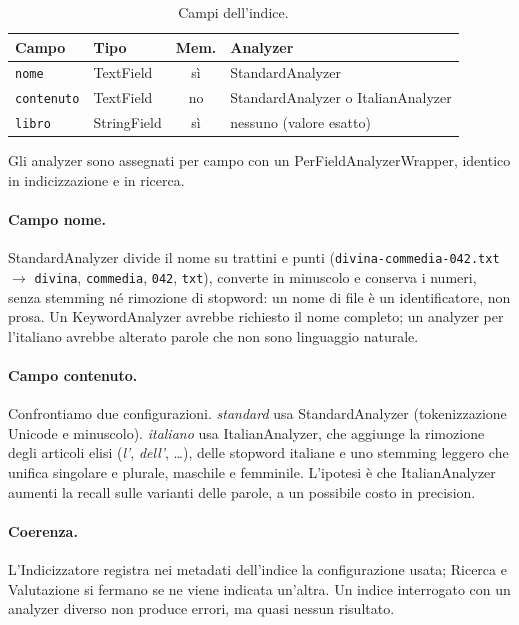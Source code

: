 \documentclass[10pt,a4paper,twocolumn]{article}
\newcommand{\file}[1]{\texttt{#1}}
\newcommand{\cls}[1]{\textsf{#1}}
\begin{document}
\begin{table}[t]
\centering\footnotesize
\caption{Campi dell'indice.}
\label{tab:campi}
\setlength{\tabcolsep}{3pt}
\begin{tabularx}{\columnwidth}{@{}llcX@{}}
\toprule
\textbf{Campo} & \textbf{Tipo} & \textbf{Mem.} & \textbf{Analyzer} \\
\midrule
\texttt{nome}      & TextField   & sì & \cls{StandardAnalyzer} \\
\texttt{contenuto} & TextField   & no & \cls{StandardAnalyzer} o \cls{ItalianAnalyzer} \\
\texttt{libro}     & StringField & sì & nessuno (valore esatto) \\
\bottomrule
\end{tabularx}
\end{table}

Gli analyzer sono assegnati per campo con un \cls{PerFieldAnalyzerWrapper}, identico in indicizzazione e in
ricerca.

\paragraph{Campo nome.} \cls{StandardAnalyzer} divide il nome su trattini e punti
(\file{divina-commedia-042.txt} $\rightarrow$ \texttt{divina}, \texttt{commedia}, \texttt{042}, \texttt{txt}),
converte in minuscolo e conserva i numeri, senza stemming né rimozione di stopword: un nome di file è un
identificatore, non prosa. Un \cls{KeywordAnalyzer} avrebbe richiesto il nome completo; un analyzer per
l'italiano avrebbe alterato parole che non sono linguaggio naturale.

\paragraph{Campo contenuto.} Confrontiamo due configurazioni. \emph{standard} usa \cls{StandardAnalyzer}
(tokenizzazione Unicode e minuscolo). \emph{italiano} usa \cls{ItalianAnalyzer}, che aggiunge la rimozione degli
articoli elisi (\emph{l'}, \emph{dell'}, \dots), delle stopword italiane e uno stemming leggero che unifica
singolare e plurale, maschile e femminile. L'ipotesi è che \cls{ItalianAnalyzer} aumenti la recall sulle
varianti delle parole, a un possibile costo in precision.

\paragraph{Coerenza.} L'\cls{Indicizzatore} registra nei metadati dell'indice la configurazione usata;
\cls{Ricerca} e \cls{Valutazione} si fermano se ne viene indicata un'altra. Un indice interrogato con un analyzer
diverso non produce errori, ma quasi nessun risultato.
\end{document}
